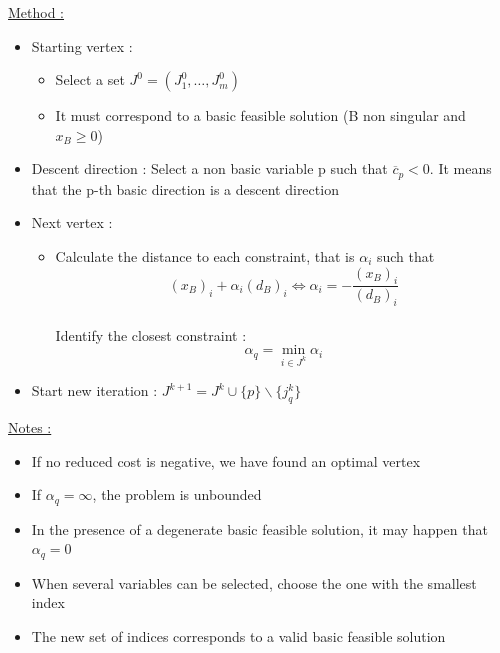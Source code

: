 \documentclass[../main.tex]{subfiles}
\begin{document}
\quad \underline{Method :}\begin{itemize}
    \item Starting vertex : \begin{itemize}
        \item Select a set $J^0 = (J_1^0, \dots, J_m^0)$\\
        \item It must correspond to a basic feasible solution (B non singular and $x_B\geq 0$)\\
    \end{itemize}
    \item Descent direction : Select a non basic variable p such that $\overline{c}_p < 0$. It means that the p-th basic direction is a descent direction\\
    \item Next vertex : \begin{itemize}
        \item Calculate the distance to each constraint, that is $\alpha_i$ such that \begin{equation}
            (x_B)_i + \alpha_i (d_B)_i \Leftrightarrow \alpha_i = -\frac{(x_B)_i}{(d_B)_i}
        \end{equation}\\
        Identify the closest constraint : \begin{equation}
            \alpha_q = \min_{i\in J^k} \alpha_i
        \end{equation}
    \end{itemize}
    \item Start new iteration : $J^{k+1} = J^k \cup \{p\} \backslash \{j_q^k\}$\\
\end{itemize}

\quad \underline{Notes :}\begin{itemize}
    \item If no reduced cost is negative, we have found an optimal vertex\\
    \item If $\alpha_q = \infty$, the problem is unbounded\\
    \item In the presence of a degenerate basic feasible solution, it may happen that $\alpha_q =0$\\
    \item When several variables can be selected, choose the one with the smallest index\\
    \item The new set of indices corresponds to a valid basic feasible solution\\
\end{itemize}
\end{document}
